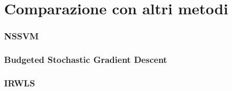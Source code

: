 \section{Comparazione con altri metodi}\label{sec:comparazione_metodi}

\subsubsection{NSSVM}

\subsubsection{Budgeted Stochastic Gradient Descent}

\subsubsection{IRWLS}












